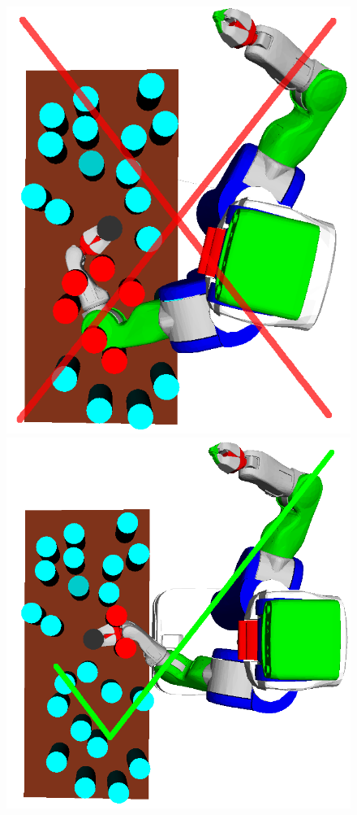 \begin{figure}[t]
  \centering
    \includegraphics[scale=0.17]{images/grasp_teaser_bad.png}
    \includegraphics[scale=0.17]{images/grasp_teaser_good.png}

\end{figure}

